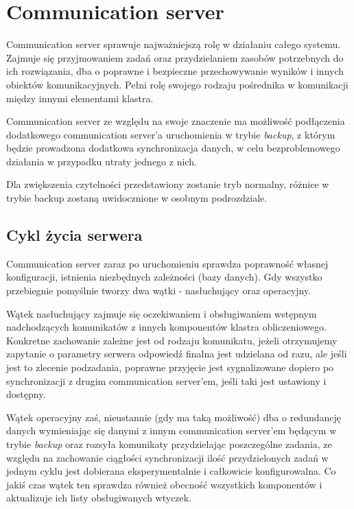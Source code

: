 \documentclass[12pt,a4paper,titlepage]{report}
\begin{document}
\chapter{Communication server}
		Communication server sprawuje najważniejszą rolę w działaniu całego systemu. Zajmuje się
		przyjmowaniem zadań oraz przydzielaniem zasobów potrzebnych do ich rozwiązania,
		dba o poprawne i bezpieczne przechowywanie wyników i innych obiektów komunikacyjnych.
		Pełni rolę swojego rodzaju pośrednika w komunikacji między innymi elementami klastra.
		
		Communication server ze względu na swoje znaczenie ma możliwość podłączenia dodatkowego
		communication server'a uruchomienia w trybie \textit{backup}, z którym będzie
		prowadzona dodatkowa synchronizacja danych, w celu bezproblemowego działania
		w przypadku utraty jednego z nich.
		
		Dla zwiększenia czytelności przedstawiony zostanie tryb normalny, różnice w trybie
		backup zostaną uwidocznione w osobnym podrozdziale.
		
		
	\section{Cykl życia serwera}
		Communication server zaraz po uruchomieniu sprawdza poprawność własnej konfiguracji,
		istnienia niezbędnych zależności (bazy danych). Gdy wszystko przebiegnie pomyślnie
		tworzy dwa wątki - nasłuchujący oraz operacyjny.
		
		Wątek nasłuchujący zajmuje się oczekiwaniem i obsługiwaniem wstępnym nadchodzących 
		komunikatów z innych komponentów klastra obliczeniowego. Konkretne zachowanie zależne
		jest od rodzaju komunikatu, jeżeli otrzymujemy zapytanie o parametry serwera
		odpowiedź finalna jest udzielana od razu, ale jeśli jest to zlecenie podzadania,
		poprawne przyjęcie jest sygnalizowane dopiero po synchronizacji z drugim communication server'em,
		jeśli taki jest ustawiony i dostępny.
		
		Wątek operacyjny zaś, nieustannie (gdy ma taką możliwość) dba o redundancję danych wymieniając 
		się danymi z innym communication server'em będącym w trybie \textit{backup} oraz rozsyła komunikaty 
		przydzielając poszczególne zadania,	ze względu na zachowanie ciągłości synchronizacji ilość 
		przydzielonych zadań w jednym cyklu jest dobierana eksperymentalnie i całkowicie konfigurowalna.
		Co jakiś czas wątek ten sprawdza również obecność wszystkich komponentów i aktualizuje ich listy
		obsługiwanych wtyczek. 
		
\end{document}
